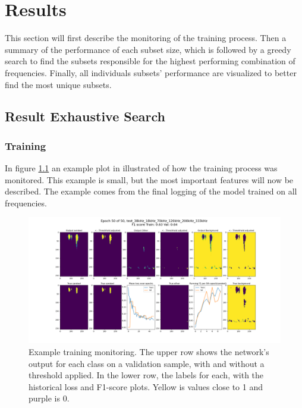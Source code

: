 \chapter{Results} \label{results}
This section will first describe the monitoring of the training process. Then a summary of the performance of each subset size, which is followed by a greedy search to find the subsets responsible for the highest performing combination of frequencies. Finally, all individuals subsets' performance are visualized to better find the most unique subsets.

\section{Result Exhaustive Search}
    
    \subsection{Training}
        In figure \ref{training_overveiw_fig} an example plot in illustrated of how the training process was monitored. This example is small, but the most important features will now be described. The example comes from the final logging of the model trained on all frequencies.
        \clearpage
        \begin{figure}[H]

            \hspace*{-3.2cm}
            \includegraphics[scale=0.45]{figures/epoch_50_test_38kHz_18kHz_70kHz_120kHz_200kHz_333kHz.png}
            \caption[Training example monitoring]{Example training monitoring. The upper row shows the network's output for each class on a validation sample, with and without a threshold applied. In the lower row, the labels for each, with the historical loss and F1-score plots. Yellow is values close to 1 and purple is 0.}
          	\medskip 
            \label{training_overveiw_fig}
        \end{figure}
        

